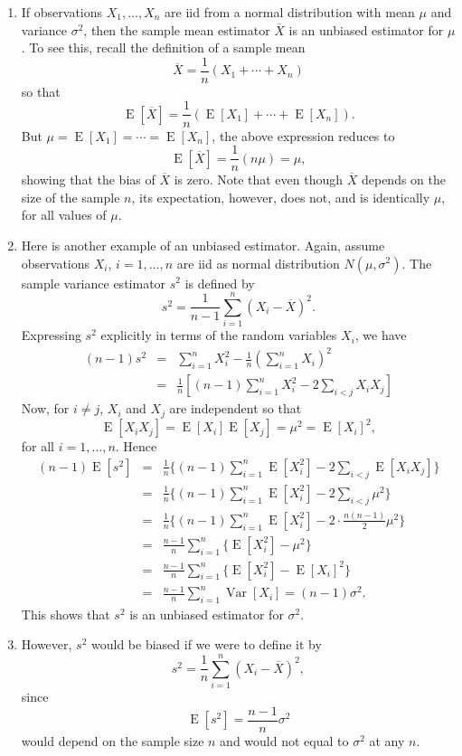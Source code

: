 \documentclass[12pt]{article}
\begin{document}
\begin{enumerate}
\item If observations $X_1,\ldots,X_n$ are iid from a normal distribution with
mean $\mu$ and variance $\sigma^2$, then the sample mean estimator
$\overline{X}$ is an unbiased estimator for $\mu$.  To see this, recall the definition of a sample mean $$\overline{X}=\frac{1}{n}(X_1+\cdots+X_n)$$ so that
$$\operatorname{E}[\overline{X}]=\frac{1}{n}(\operatorname{E}[X_1]+ \cdots+\operatorname{E}[X_n]).$$
But $\mu=\operatorname{E}[X_1]=\cdots=\operatorname{E}[X_n]$, the
above expression reduces to $$\operatorname{E}[\overline{X}]=\frac{1}{n}(n\mu)=\mu,$$ showing that the bias of $\overline{X}$ is zero.  Note that even though
$\overline{X}$ depends on the size of the sample $n$, its expectation, however, does not, and is identically $\mu$, for all values of $\mu$.
\item Here is another example of an unbiased estimator.  Again, assume observations $X_i$, $i=1,\ldots,n$ are iid as normal distribution
$N(\mu,\sigma^2)$.  The sample variance estimator $s^2$ is defined
by $$s^2=\frac{1}{n-1}\sum_{i=1}^{n}(X_i-\overline{X})^2.$$
Expressing $s^2$ explicitly in terms of the random variables $X_i$,
we have 
\begin{eqnarray}
(n-1)s^2 &=& \sum_{i=1}^{n}X_i^2-\frac{1}{n}(\sum_{i=1}^{n}X_i)^2 \\ 
&=& \frac{1}{n}[(n-1)\sum_{i=1}^{n}X_i^2-2\sum_{i<j}X_iX_j] 
\end{eqnarray}
Now, for $i\neq j$, $X_i$ and $X_j$ are independent so that
$$\operatorname{E}[X_iX_j]=\operatorname{E}[X_i]\operatorname{E}[X_j]=\mu^2
=\operatorname{E}[X_i]^2,$$ for all $i=1,\ldots,n$.  Hence 
\begin{eqnarray}
(n-1)\operatorname{E}[s^2] &=&
\frac{1}{n}\lbrace(n-1)\sum_{i=1}^{n}\operatorname{E}[X_i^2]- 2\sum_{i<j}\operatorname{E}[X_iX_j]\rbrace \\
&=& \frac{1}{n}\lbrace(n-1)\sum_{i=1}^{n}\operatorname{E}[X_i^2]-2\sum_{i<j}\mu^2\rbrace \\
&=& \frac{1}{n}\lbrace(n-1)\sum_{i=1}^{n}\operatorname{E}[X_i^2]-2\cdot\frac{n(n-1)}{2}\mu^2 \rbrace \\
&=& \frac{n-1}{n}\sum_{i=1}^{n}\lbrace\operatorname{E}[X_i^2]-\mu^2\rbrace \\
&=& \frac{n-1}{n}\sum_{i=1}^{n}\lbrace \operatorname{E}[X_i^2]-\operatorname{E}[X_i]^2\rbrace \\
&=& \frac{n-1}{n}\sum_{i=1}^{n}\operatorname{Var}[X_i]=(n-1)\sigma^2.
\end{eqnarray}
This shows that $s^2$ is an unbiased estimator for $\sigma^2$.
\item  However, $s^2$ would be biased if we were to define it by
$$s^2=\frac{1}{n}\sum_{i=1}^{n}(X_i-\overline{X})^2,$$ since $$\operatorname{E}[s^2]=\frac{n-1}{n}\sigma^2$$ would depend on the sample size $n$ and would not equal to $\sigma^2$ at any $n$.
\end{enumerate}
\end{document}
